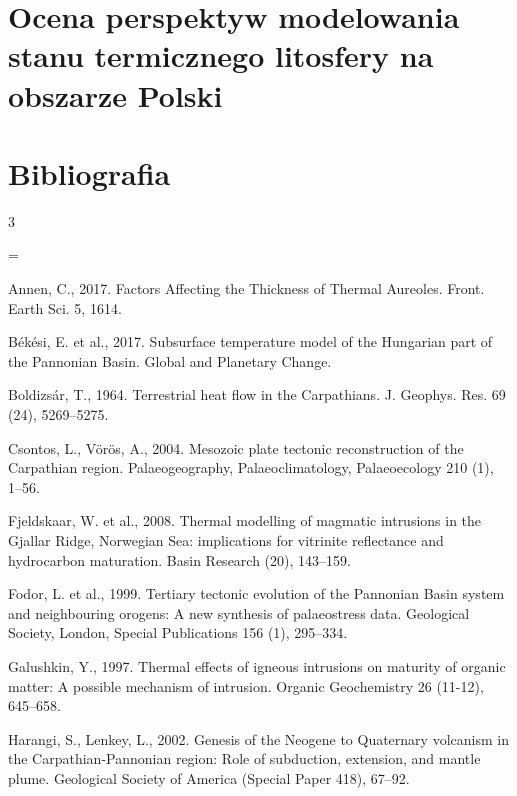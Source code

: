 \documentclass[11.5pt,twoside]{report}
\newenvironment{localsize}[1] %
{%
	\clearpage
	\let\orignewcommand\newcommand
	\let\newcommand\renewcommand
	\makeatletter
	\makeatother
	\let\newcommand\orignewcommand
}
{%
	\clearpage
}
\begin{document}
 	\chapter{Ocena perspektyw modelowania stanu termicznego litosfery na obszarze Polski}

%

\chapter*{Bibliografia}


\begin{multicols}{3} %
	
\begin{localsize}{10}
	
\parindent=0pt
\parskip=\smallskipamount

Annen, C., 2017. Factors Affecting the Thickness of Thermal Aureoles. Front. Earth Sci. 5, 1614.

Békési, E. et al., 2017. Subsurface temperature model of the Hungarian part of the Pannonian Basin. Global and Planetary Change.

Boldizsár, T., 1964. Terrestrial heat flow in the Carpathians. J. Geophys. Res. 69 (24), 5269–5275.

Csontos, L., Vörös, A., 2004. Mesozoic plate tectonic reconstruction of the Carpathian region. Palaeogeography, Palaeoclimatology, Palaeoecology 210 (1), 1–56.

Fjeldskaar, W. et al., 2008. Thermal modelling of magmatic intrusions in the Gjallar Ridge, Norwegian Sea: implications for vitrinite reflectance and hydrocarbon maturation. Basin Research (20), 143–159. 

Fodor, L. et al., 1999. Tertiary tectonic evolution of the Pannonian Basin system and neighbouring orogens: A new synthesis of palaeostress data. Geological Society, London, Special Publications 156 (1), 295–334. 

Galushkin, Y., 1997. Thermal effects of igneous intrusions on maturity of organic matter: A possible mechanism of intrusion. Organic Geochemistry 26 (11-12), 645–658. 

Harangi, S., Lenkey, L., 2002. Genesis of the Neogene to Quaternary volcanism in the Carpathian-Pannonian region: Role of subduction, extension, and mantle plume. Geological Society of America (Special Paper 418), 67–92.


\end{localsize}
\end{multicols}
\end{document}
